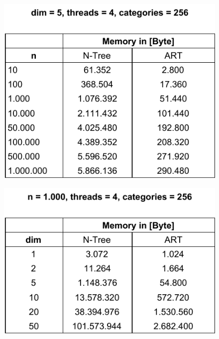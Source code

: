 \begin{figure}[H]
	\centering
	\includegraphics[width=0.53\linewidth]{figures/table-memory-usage-n}
	\label{fig:table-memory-usage-n}
\end{figure}

\begin{figure}[H]
	\centering
	\includegraphics[width=0.55\linewidth]{figures/table-memory-usage-dim}
	\label{fig:table-memory-usage-dim}
\end{figure}








